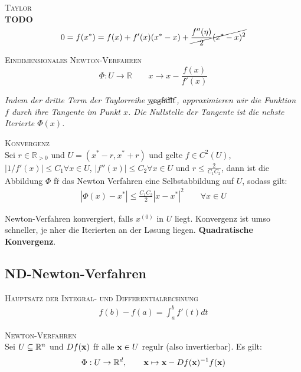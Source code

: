 \textsc{Taylor} \\
\textbf{TODO}\\
\begin{equation*}
0 = f(x^*) = f(x) + f'(x)(x^* - x) + \cancel{\frac{f''(\eta)}{2}(x^*-x)^2}
\end{equation*}\vspace{0.2cm}

\textsc{Eindimensionales Newton-Verfahren}\\
\begin{equation*}
\Phi : U \rightarrow \mathbb{R} \qquad x \rightarrow x- \frac{f(x)}{f'(x)}
\end{equation*}

\emph{Indem der dritte Term der Taylorreihe $\cancel{\text{wegf\"{a}llt}}$, approximieren wir die Funktion $f$ durch ihre Tangente im Punkt $x$. Die Nullstelle der Tangente ist die n\a chste Iterierte $\Phi(x)$.}\vspace{0.2cm}

\textsc{Konvergenz}\\
Sei $r\in \mathbb{R}_{>0}$ und $U=(x^*-r, x^*+r)$ und gelte $f\in C^2(U)$, $|1/f'(x)|\leq C_1 \forall x\in U$, $|f''(x)| \leq C_2 \forall x\in U$ und $r \leq \frac{2}{C_1C_2}$, dann ist die Abbildung $\Phi$ f\u r das Newton Verfahren eine Selbstabbildung auf $U$, sodass gilt:
\begin{align*}
|\Phi(x) - x^* | \leq \frac{C_1C_2}{2}|x-x^*|^2 \qquad \forall x\in U
\end{align*}

Newton-Verfahren konvergiert, falls $x^{(0)}$ in $U$ liegt. Konvergenz ist umso schneller, je n\a her die Iterierten an der L\o sung liegen. \textbf{Quadratische Konvergenz}.

\subsection{ND-Newton-Verfahren}
\textsc{Hauptsatz der Integral- und Differentialrechnung}\\
\begin{align*}
f(b)-f(a) = \int_a^b f'(t) dt
\end{align*}\vspace{0.2cm}

\textsc{Newton-Verfahren}\\
Sei $U \subseteq \mathbb{R}^{n}$ und $Df(\mbox{\bf x})$ f\u r alle $\mbox{\bf x} \in U$ regul\a r (also invertierbar). Es gilt:
\begin{align*}
\Phi : U \rightarrow \mathbb{R}^{d}, \qquad \mbox{\bf x} \mapsto \mbox{\bf x} - Df(\mbox{\bf x})^{-1}f(\mbox{\bf x})
\end{align*}\vspace{0.2cm}

